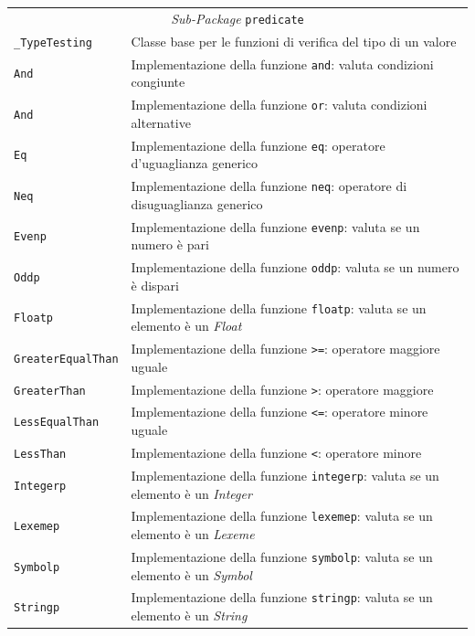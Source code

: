 \begin{longtable}{p{3.5cm}p{8.5cm}}
\multicolumn{2}{c}{\emph{Sub-Package} \texttt{predicate}}\\
	\hdashline[5pt/5pt]
		\texttt{\_TypeTesting} & Classe base per le funzioni di verifica del tipo di un valore \\ 
	\hdashline[1pt/5pt]
		\texttt{And} & Implementazione della funzione \texttt{and}: valuta condizioni congiunte\\ 
	\hdashline[1pt/5pt]
		\texttt{And} & Implementazione della funzione \texttt{or}: valuta condizioni alternative\\ 
	\hdashline[1pt/5pt]
		\texttt{Eq} & Implementazione della funzione \texttt{eq}: operatore d'uguaglianza generico\\ 
	\hdashline[1pt/5pt]
		\texttt{Neq} & Implementazione della funzione \texttt{neq}: operatore di disuguaglianza generico\\ 
	\hdashline[1pt/5pt]
		\texttt{Evenp} & Implementazione della funzione \texttt{evenp}: valuta se un numero è pari\\ 
	\hdashline[1pt/5pt]
		\texttt{Oddp} & Implementazione della funzione \texttt{oddp}: valuta se un numero è dispari\\ 
	\hdashline[1pt/5pt]
		\texttt{Floatp} & Implementazione della funzione \texttt{floatp}: valuta se un elemento è un \emph{Float}\\ 
	\hdashline[1pt/5pt]
		\texttt{GreaterEqualThan} & Implementazione della funzione \texttt{>=}: operatore maggiore uguale\\ 
	\hdashline[1pt/5pt]
		\texttt{GreaterThan} & Implementazione della funzione \texttt{>}: operatore maggiore\\
	\hdashline[1pt/5pt]
		\texttt{LessEqualThan} & Implementazione della funzione \texttt{<=}: operatore minore uguale\\ 
	\hdashline[1pt/5pt]
		\texttt{LessThan} & Implementazione della funzione \texttt{<}: operatore minore\\
	\hdashline[1pt/5pt]
		\texttt{Integerp} & Implementazione della funzione \texttt{integerp}: valuta se un elemento è un \emph{Integer}\\
	\hdashline[1pt/5pt]
		\texttt{Lexemep} & Implementazione della funzione \texttt{lexemep}: valuta se un elemento è un \emph{Lexeme}\\
	\hdashline[1pt/5pt]
		\texttt{Symbolp} & Implementazione della funzione \texttt{symbolp}: valuta se un elemento è un \emph{Symbol}\\
	\hdashline[1pt/5pt]
		\texttt{Stringp} & Implementazione della funzione \texttt{stringp}: valuta se un elemento è un \emph{String}\\

\end{longtable}
